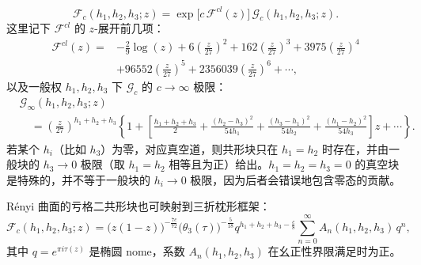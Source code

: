 \begin{equation}
  \label{eq:5-45}
  \mathcal{F}_c(h_1,h_2,h_3;z)
  = \exp\bigl[c\,\mathcal{F}^{cl}(z)\bigr]\,
    \mathcal{G}_c(h_1,h_2,h_3;z).
\end{equation}
这里记下 $\mathcal{F}^{cl}$ 的 $z$-展开前几项：
\begin{equation}
  \label{eq:5-46}
  \begin{aligned}
    \mathcal{F}^{cl}(z)
    = {}& -\frac{2}{9}\log(z)
      + 6\left(\frac{z}{27}\right)^2
      + 162\left(\frac{z}{27}\right)^3
      + 3975\left(\frac{z}{27}\right)^4\\
      & + 96552\left(\frac{z}{27}\right)^5
      + 2356039\left(\frac{z}{27}\right)^6
      + \cdots,
  \end{aligned}
\end{equation}
以及一般权 $h_1,h_2,h_3$ 下 $\mathcal{G}_c$ 的 $c\to\infty$ 极限：
\begin{equation}
  \label{eq:5-47}
  \begin{aligned}
    &\mathcal{G}_\infty(h_1,h_2,h_3;z)\\
    &\quad = \left(\frac{z}{27}\right)^{h_1+h_2+h_3}
    \left\{ 1 + \left[
      \frac{h_1+h_2+h_3}{2}
      + \frac{(h_2-h_3)^2}{54h_1}
      + \frac{(h_3-h_1)^2}{54h_2}
      + \frac{(h_1-h_2)^2}{54h_3}\right] z
      + \cdots\right\}.
  \end{aligned}
\end{equation}
若某个 $h_i$（比如 $h_3$）为零，对应真空道，则共形块只在 $h_1=h_2$ 时存在，并由一般块的 $h_3\to0$ 极限（取 $h_1=h_2$ 相等且为正）给出。$h_1=h_2=h_3=0$ 的真空块是特殊的，并不等于一般块的 $h_i\to0$ 极限，因为后者会错误地包含零态的贡献。


Rényi 曲面的亏格二共形块也可映射到三折枕形框架：
\begin{equation}
  \label{eq:5-48}
  \mathcal{F}_c(h_1,h_2,h_3;z)
  = \bigl(z(1-z)\bigr)^{-\frac{7c}{72}}
    \bigl(\theta_3(\tau)\bigr)^{-\frac{5}{18}}
    q^{h_1+h_2+h_3-\frac{c}{8}}
    \sum_{n=0}^{\infty} A_n(h_1,h_2,h_3)\,q^n,
\end{equation}
其中 $q=e^{\pi i\tau(z)}$ 是椭圆 nome，系数 $A_n(h_1,h_2,h_3)$ 在幺正性界限满足时为正。


